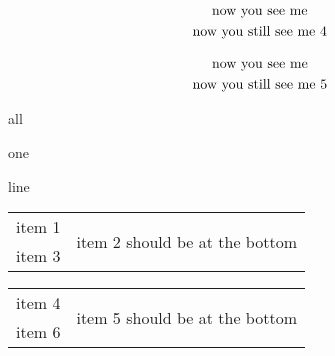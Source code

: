 \documentclass[oneside]{book}
\begin{document}
%
\begin{gather*}
\mbox{now you see me}\\
\makebox[1pt]{now you still see me 4}
\end{gather*}

\begin{gather*}
\mbox{now you see me}\\
\makebox[0pt]{now you still see me 5}
\end{gather*}

\parbox{.3\linewidth}{all}%
\parbox{.2\linewidth}{one}%
\parbox{.4\linewidth}{line}

\noindent
\begin{minipage}{.5\linewidth}%
\begin{tabular}{ c c }
item 1 & \multirow{2}{*}{item 2 should be at the bottom} \\
item 3
\end{tabular}
\end{minipage}%

\begin{minipage}{.5\linewidth}%
\begin{tabular}{ c c }
item 4 & \multirow{2}{*}{item 5 should be at the bottom} \\
item 6
\end{tabular}
\end{minipage}

\printindex
\end{document}
